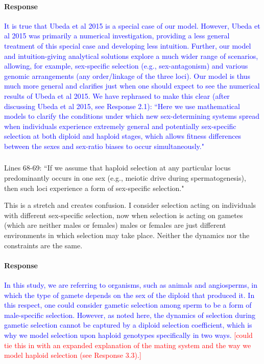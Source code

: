 \documentclass[10pt,letterpaper]{article}
\begin{document}
\noindent\paragraph{Response}
\textcolor{blue}{It is true that Ubeda et al 2015 is a special case of our model. 
However, Ubeda et al 2015 was primarily a numerical investigation, providing a less general treatment of this special case and developing less intuition.
Further, our model and intuition-giving analytical solutions explore a much wider range of scenarios, allowing, for example, sex-specific selection (e.g., sex-antagonism) and various genomic arrangements (any order/linkage of the three loci).
Our model is thus much more general and clarifies just when one should expect to see the numerical results of Ubeda et al 2015.
We have rephrased to make this clear (after discussing Ubeda et al 2015, see Response 2.1): ``Here we use mathematical models to clarify the conditions under which new sex-determining systems spread when individuals experience extremely general and potentially sex-specific selection at both diploid and haploid stages, which allows fitness differences between the sexes and sex-ratio biases to occur simultaneously."
}

\noindent\subsubsection{}
Lines 68-69: ``If we assume that haploid selection at any particular locus predominantly occurs in one sex (e.g., meiotic drive during spermatogenesis), then such loci experience a form of sex-specific selection." 

This is a stretch and creates confusion. I consider selection acting on individuals with different sex-specific selection, now when selection is acting on gametes (which are neither males or females) males or females are just different environments in which selection may take place. Neither the dynamics nor the constraints are the same. 

\noindent\paragraph{Response}
\textcolor{blue}{In this study, we are referring to organisms, such as animals and angiosperms, in which the type of gamete depends on the sex of the diploid that produced it. In this respect, one could consider gametic selection among sperm to be a form of male-specific selection. However, as noted here, the dynamics of selection during gametic selection cannot be captured by a diploid selection coefficient, which is why we model selection upon haploid genotypes specifically in two ways. }
\textcolor{red}{
[could tie this in with an expanded explanation of the mating system and the way we model haploid selection (see Response 3.3).]}
\end{document}
